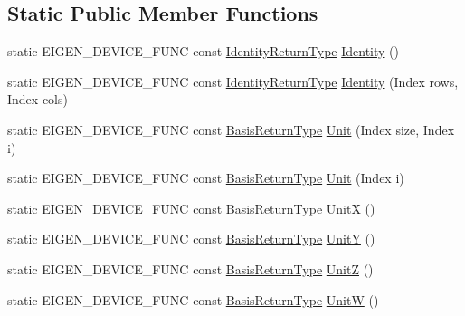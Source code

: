 \subsection*{Static Public Member Functions}
\begin{DoxyCompactItemize}
\item 
static E\+I\+G\+E\+N\+\_\+\+D\+E\+V\+I\+C\+E\+\_\+\+F\+U\+NC const \mbox{\hyperlink{class_eigen_1_1_cwise_nullary_op}{Identity\+Return\+Type}} \mbox{\hyperlink{class_eigen_1_1_matrix_base_a2ef43190f3aba0aef0cf1030d46d0ca7}{Identity}} ()
\item 
static E\+I\+G\+E\+N\+\_\+\+D\+E\+V\+I\+C\+E\+\_\+\+F\+U\+NC const \mbox{\hyperlink{class_eigen_1_1_cwise_nullary_op}{Identity\+Return\+Type}} \mbox{\hyperlink{class_eigen_1_1_matrix_base_ae717f291d83ab229ae64a4903d9f987d}{Identity}} (Index rows, Index cols)
\item 
static E\+I\+G\+E\+N\+\_\+\+D\+E\+V\+I\+C\+E\+\_\+\+F\+U\+NC const \mbox{\hyperlink{class_eigen_1_1_block}{Basis\+Return\+Type}} \mbox{\hyperlink{class_eigen_1_1_matrix_base_a1f39dde25807c1f008aa874e690b3fed}{Unit}} (Index size, Index i)
\item 
static E\+I\+G\+E\+N\+\_\+\+D\+E\+V\+I\+C\+E\+\_\+\+F\+U\+NC const \mbox{\hyperlink{class_eigen_1_1_block}{Basis\+Return\+Type}} \mbox{\hyperlink{class_eigen_1_1_matrix_base_a9d7e97faf7755d3e85e831153f02846c}{Unit}} (Index i)
\item 
static E\+I\+G\+E\+N\+\_\+\+D\+E\+V\+I\+C\+E\+\_\+\+F\+U\+NC const \mbox{\hyperlink{class_eigen_1_1_block}{Basis\+Return\+Type}} \mbox{\hyperlink{class_eigen_1_1_matrix_base_ac12aa899494685551e11f238836ee600}{UnitX}} ()
\item 
static E\+I\+G\+E\+N\+\_\+\+D\+E\+V\+I\+C\+E\+\_\+\+F\+U\+NC const \mbox{\hyperlink{class_eigen_1_1_block}{Basis\+Return\+Type}} \mbox{\hyperlink{class_eigen_1_1_matrix_base_ab8e21066a2e5cf5ca8bb0383e44a6efa}{UnitY}} ()
\item 
static E\+I\+G\+E\+N\+\_\+\+D\+E\+V\+I\+C\+E\+\_\+\+F\+U\+NC const \mbox{\hyperlink{class_eigen_1_1_block}{Basis\+Return\+Type}} \mbox{\hyperlink{class_eigen_1_1_matrix_base_a122e525a8f5ef3e4d459055615f662de}{UnitZ}} ()
\item 
static E\+I\+G\+E\+N\+\_\+\+D\+E\+V\+I\+C\+E\+\_\+\+F\+U\+NC const \mbox{\hyperlink{class_eigen_1_1_block}{Basis\+Return\+Type}} \mbox{\hyperlink{class_eigen_1_1_matrix_base_ac28c3d440440464b1fc8d9f2a6d5624a}{UnitW}} ()
\end{DoxyCompactItemize}

